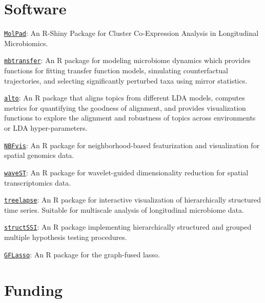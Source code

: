 \documentclass[letterpaper]{article}
\renewenvironment{itemize}{
  \begin{list}{}{
    \setlength{\leftmargin}{1.5em}
  }
}{
  \end{list}
}
\begin{document}
\section*{Software}

\begin{itemize}
\item \href{https://kaiyanm.github.io/MolPad/}{\texttt{MolPad}}: An R-Shiny Package for Cluster Co-Expression
Analysis in Longitudinal Microbiomics.
\item \href{https://krisrs1128.github.io/mbtransfer/}{\texttt{mbtransfer}}: An R
package for modeling microbiome dynamics which provides functions for fitting
transfer function models, simulating counterfactual trajectories, and selecting
significantly perturbed taxa using mirror statistics.
\item \href{https://lasy.github.io/alto/}{\texttt{alto}}: An R package that
aligns topics from different LDA models, computes metrics for quantifying the
goodness of alignment, and provides visualization functions to explore the
alignment and robustness of topics across environments or LDA hyper-parameters.
\item \href{https://github.com/XTH1114/NBFvis}{\texttt{NBFvis}}: An R package for neighborhood-based featurization and
visualization for spatial genomics data.
\item \href{https://github.com/OliverXUZY/waveST/}{\texttt{waveST}}: An R
package for wavelet-guided dimensionality reduction for spatial transcriptomics
data.
\item \href{https://krisrs1128.github.io/treelapse/}{\texttt{treelapse}}: An R
package for interactive visualization of hierarchically structured time series.
Suitable for multiscale analysis of longitudinal microbiome data.
\item \href{https://github.com/krisrs1128/structSSI}{\texttt{structSSI}}: An R
package implementing hierarchically structured and grouped multiple hypothesis
testing procedures.
\item \href{https://github.com/krisrs1128/GFLasso}{\texttt{GFLasso}}: An R
package for the graph-fused lasso.
\end{itemize}

\section*{Funding}
\end{document}
